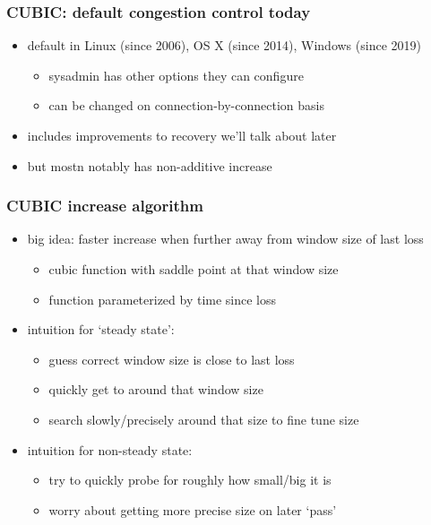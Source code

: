 \begin{frame}
\frametitle{CUBIC: default congestion control today}
    \begin{itemize}
    \item default in Linux (since 2006), OS X (since 2014), Windows (since 2019)
        \begin{itemize}
        \item sysadmin has other options they can configure
        \item can be changed on connection-by-connection basis
        \end{itemize}
    \item includes improvements to recovery we'll talk about later
    \item but mostn notably has non-additive increase
    \end{itemize}
\end{frame}

\begin{frame}
    \frametitle{CUBIC increase algorithm}
    \begin{itemize}
    \item big idea: faster increase when further away from window size of last loss
        \begin{itemize}
        \item cubic function with saddle point at that window size
        \item function parameterized by time since loss
        \end{itemize}
    \item intuition for `steady state':
        \begin{itemize}
        \item guess correct window size is close to last loss
        \item quickly get to around that window size
        \item search slowly/precisely around that size to fine tune size
        \end{itemize}
    \item intuition for non-steady state:
        \begin{itemize}
        \item try to quickly probe for roughly how small/big it is
        \item worry about getting more precise size on later `pass'
        \end{itemize}
    \end{itemize}
\end{frame}

